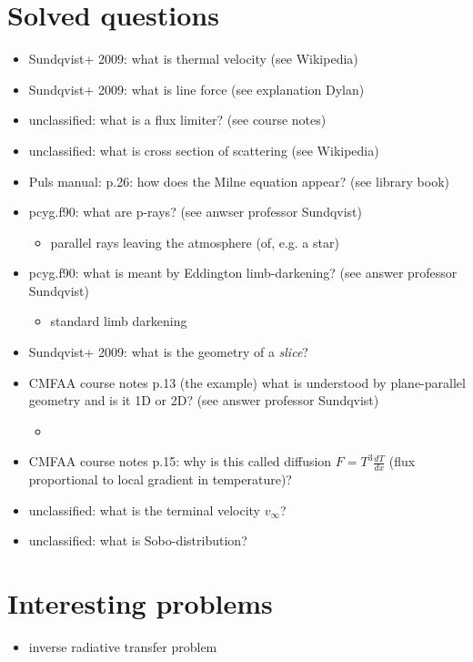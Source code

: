 \documentclass[../main/main.tex]{subfiles}
\begin{document}
\section{Solved questions}
\begin{itemize}
\item Sundqvist+ 2009: what is thermal velocity (see Wikipedia)
\item Sundqvist+ 2009: what is line force (see explanation Dylan)
\item unclassified: what is a flux limiter? (see course notes)
\item unclassified: what is cross section of scattering (see Wikipedia)
\item Puls manual: p.26: how does the Milne equation appear? (see library book)

\item pcyg.f90: what are p-rays? (see anwser professor Sundqvist)
\begin{itemize}
\item parallel rays leaving the atmosphere (of, e.g. a star)
\begin{center}
\end{center}
\end{itemize}  

\item pcyg.f90: what is meant by Eddington limb-darkening? (see answer professor Sundqvist)
\begin{itemize}
\item standard limb darkening
\end{itemize}
\item Sundqvist+ 2009: what is the geometry of a \textit{slice}?

\item CMFAA course notes p.13 (the example) what is understood by plane-parallel geometry and is it 1D or 2D? (see answer professor Sundqvist)
\begin{itemize}
\item 
\end{itemize}

\item CMFAA course notes p.15: why is this called diffusion $F=T^3 \frac{dT}{dx}$ (flux proportional to local gradient in temperature)?

\item unclassified: what is the terminal velocity $v_{\infty}$?

\item unclassified: what is Sobo-distribution?
\end{itemize}

\newpage
\section{Interesting problems}
\begin{itemize}
\item inverse radiative transfer problem
\end{itemize}
\end{document}

